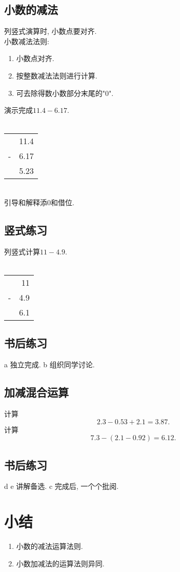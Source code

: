 \begin{CJK}{UTF8}{gkai}
\subsection{小数的减法}
列竖式演算时, 小数点要对齐.\\
小数减法法则:
\begin{enumerate}
\item 小数点对齐.
\item 按整数减法法则进行计算.
\item 可去除得数小数部分末尾的"0".
\end{enumerate}
演示完成$11.4-6.17.$\\
\vspace{7mm}\\
\begin{tabular}{cD{.}{.}{2}}
&11.4\\
- &6.17\\
\hline
& 5.23
\end{tabular}
\vspace{7mm}\\
引导和解释添0和借位.

\subsection{竖式练习}
列竖式计算$11-4.9 .$\\
\vspace{7mm}\\
\begin{tabular}{cD{.}{.}{1}}
&11\\
- &4.9\\
\hline
& 6.1
\end{tabular}

\subsection{书后练习}
a 独立完成.
b 组织同学讨论.

\subsection{加减混合运算}
计算$$2.3-0.53+2.1=3.87 .$$
计算$$7.3-(2.1-0.92)=6.12 .$$

\subsection{书后练习}
d e 讲解备选.
c 完成后, 一个个批阅.

\section{小结}
\begin{enumerate}
\item 小数的减法运算法则.
\item 小数加减法的运算法则异同.
\end{enumerate}


\end{CJK}
